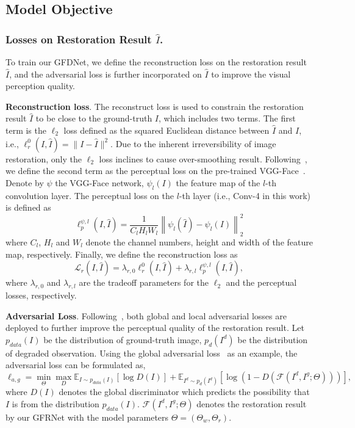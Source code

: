 \documentclass[runningheads]{llncs}
\begin{document}
\subsection{Model Objective}
\subsubsection{Losses on Restoration Result $\hat{I}$.}
To train our GFDNet, we define the reconstruction loss on the restoration result $\hat{I}$, and the adversarial loss is further incorporated on $\hat{I}$ to improve the visual perception quality.

\textbf{Reconstruction loss}.
The reconstruct loss is used to constrain the restoration result $\hat{I}$ to be close to the ground-truth $I$, which includes two terms.
The first term is the $\ell_2$ loss defined as the squared Euclidean distance between $\hat{I}$ and $I$, i.e., $ \ell_r^{0}(I, \hat{I}) = \| I - \hat{I} \|^2$.
Due to the inherent irreversibility of image restoration, only the $\ell_2$ loss inclines to cause over-smoothing result.
Following~\cite{johnson2016perceptual}, we define the second term as the perceptual loss on the pre-trained VGG-Face~\cite{parkhi2015deep}.
Denote by $\psi$ the VGG-Face network, $\psi_l(I)$ the feature map of the $l$-th convolution layer.
The perceptual loss on the $l$-th layer (i.e., Conv-4 in this work) is defined as
\begin{equation}\label{eqn:perceptual}
\ell_p^{\psi,l}(I, \hat{I}) = \frac{1}{C_l H_l W_l} \left\| {{\psi _l}(\hat{I}) - {\psi _l}(I)} \right\|_2^2
\end{equation}
where $C_l$, $H_l$ and $W_l$ denote the channel numbers, height and width of the feature map, respectively.
Finally, we define the reconstruction loss as
\begin{equation}\label{eqn:reconstruction}
\mathcal{L}_r(I, \hat{I}) = \lambda_{r,0} \ell_r^{0}(I, \hat{I}) + \lambda_{r,l} \ell_p^{\psi,l}(I, \hat{I}),
\end{equation}
where $\lambda_{r,0}$ and $\lambda_{r,l}$ are the tradeoff parameters for the $\ell_2$ and the perceptual losses, respectively.

\textbf{Adversarial Loss}.
Following~\cite{li2017generative,iizuka2017globally}, both global and local adversarial losses are deployed to further improve the perceptual quality of the restoration result.
Let $p_{data}({I})$ be the distribution of ground-truth image, $p_{d}({I^d})$ be the distribution of degraded observation.
Using the global adversarial loss~\cite{Goodfellow2014Generative} as an example, the adversarial loss can be formulated as,
\begin{equation}\label{eqn:globalgan}
\ell_{a,g} \!=\! \min_{\Theta} \max_{D}  \mathbb{E}_{I \sim p_{data}({I})} [\log D({I})] + \mathbb{E}_{I^d \sim p_{d}({I^d})} [\log ( 1 \!-\! D(\mathcal{F}(I^{d}, I^{g}; \Theta)) )],
\end{equation}
where $D(I)$ denotes the global discriminator which predicts the possibility that $I$ is from the distribution $p_{data}({I})$. $\mathcal{F}(I^{d}, I^{g}; \Theta)$ denotes the restoration result by our GFRNet with the model parameters $\Theta = (\Theta_w, \Theta_r)$.
\end{document}
